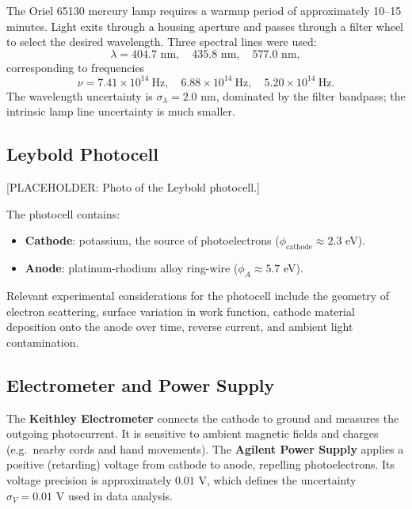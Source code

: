 \documentclass[12pt]{article}
\begin{document}
The Oriel 65130 mercury lamp requires a warmup period of approximately 10--15 minutes. Light exits through a housing aperture and passes through a filter wheel to select the desired wavelength. Three spectral lines were used:
\begin{equation}
    \lambda = 404.7 \text{ nm}, \quad 435.8 \text{ nm}, \quad 577.0 \text{ nm},
\end{equation}
corresponding to frequencies
\begin{equation}
    \nu = 7.41 \times 10^{14}\ \text{Hz}, \quad 6.88 \times 10^{14}\ \text{Hz}, \quad 5.20 \times 10^{14}\ \text{Hz}.
\end{equation}
The wavelength uncertainty is $\sigma_\lambda = 2.0$ nm, dominated by the filter bandpass; the intrinsic lamp line uncertainty is much smaller.

\subsection{Leybold Photocell}

[PLACEHOLDER: Photo of the Leybold photocell.]

The photocell contains:
\begin{itemize}
    \item \textbf{Cathode}: potassium, the source of photoelectrons ($\phi_\text{cathode} \approx 2.3$ eV).
    \item \textbf{Anode}: platinum-rhodium alloy ring-wire ($\phi_A \approx 5.7$ eV).
\end{itemize}
Relevant experimental considerations for the photocell include the geometry of electron scattering, surface variation in work function, cathode material deposition onto the anode over time, reverse current, and ambient light contamination.

\subsection{Electrometer and Power Supply}

The \textbf{Keithley Electrometer} connects the cathode to ground and measures the outgoing photocurrent. It is sensitive to ambient magnetic fields and charges (e.g.\ nearby cords and hand movements). The \textbf{Agilent Power Supply} applies a positive (retarding) voltage from cathode to anode, repelling photoelectrons. Its voltage precision is approximately $0.01$ V, which defines the uncertainty $\sigma_V = 0.01$ V used in data analysis.
\end{document}

